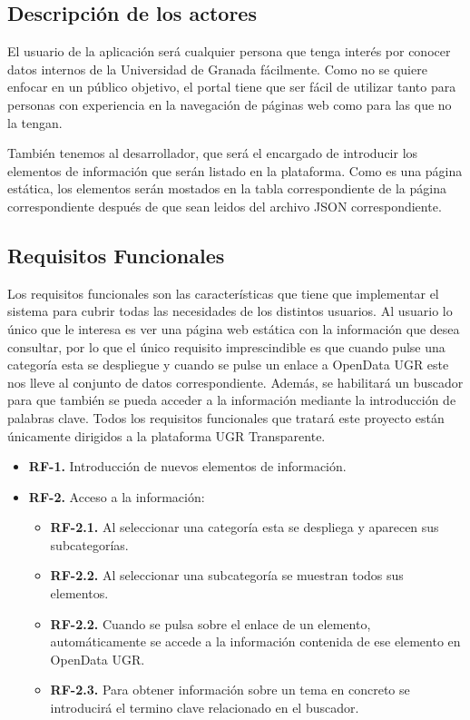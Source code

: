\newpage
\subsection{Descripción de los actores}

El usuario de la aplicación será cualquier persona que tenga interés por conocer datos internos de la Universidad de Granada 
fácilmente. Como no se quiere enfocar en un público objetivo, el portal tiene que ser fácil de utilizar tanto para personas 
con experiencia en la navegación de páginas web como para las que no la tengan.

\bigskip
También tenemos al desarrollador, que será el encargado de introducir los elementos de información que serán listado en la
plataforma. Como es una página estática, los elementos serán mostados en la tabla correspondiente de la página correspondiente
después de que sean leidos del archivo JSON correspondiente.

\subsection{Requisitos Funcionales}

Los requisitos funcionales son las características que tiene que implementar el sistema para cubrir todas las necesidades de 
los distintos usuarios. Al usuario lo único que le interesa es ver una página web estática con la información que desea 
consultar, por lo que el único requisito imprescindible es que cuando pulse una categoría esta se despliegue y cuando se 
pulse un enlace a OpenData UGR este nos lleve al conjunto de datos correspondiente. Además, se habilitará un buscador para que
también se pueda acceder a la información mediante la introducción de palabras clave. Todos los requisitos funcionales que 
tratará este proyecto están únicamente dirigidos a la plataforma UGR Transparente.

\begin{itemize}
  \item \textbf{RF-1.} Introducción de nuevos elementos de información.
\end{itemize}

\begin{itemize}
  \item \textbf{RF-2.} Acceso a la información:
  \begin{itemize}
    \item \textbf{RF-2.1.} Al seleccionar una categoría esta se despliega y aparecen sus subcategorías.
    \item \textbf{RF-2.2.} Al seleccionar una subcategoría se muestran todos sus elementos.
    \item \textbf{RF-2.2.} Cuando se pulsa sobre el enlace de un elemento, automáticamente se accede a la información contenida 
    de ese elemento en OpenData UGR.
    \item \textbf{RF-2.3.} Para obtener información sobre un tema en concreto se introducirá el termino clave relacionado en 
    el buscador.
    \end{itemize}
\end{itemize}

